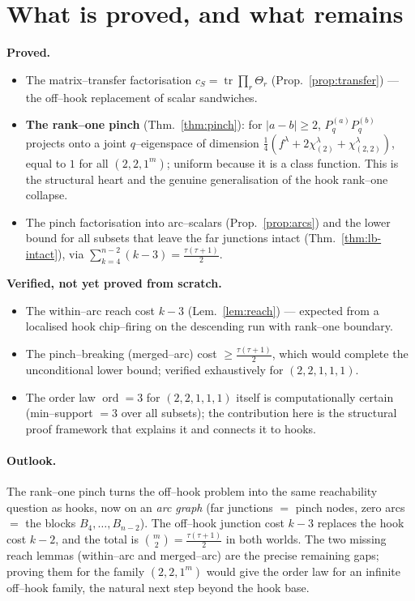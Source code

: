 \documentclass[11pt]{article}
\theoremstyle{definition}
\DeclareMathOperator{\tr}{tr}
\DeclareMathOperator{\ord}{ord}
\newcommand{\Pq}{P_{q}}
\newcommand{\la}{\lambda}
\begin{document}
\section{What is proved, and what remains}

\textbf{Proved.}
\begin{itemize}
\item The matrix--transfer factorisation $c_S=\tr\prod_r\Theta_r$
(Prop.~\ref{prop:transfer}) --- the off--hook replacement of scalar sandwiches.
\item \textbf{The rank--one pinch} (Thm.~\ref{thm:pinch}): for $|a-b|\ge2$,
$\Pq^{(a)}\Pq^{(b)}$ projects onto a joint $q$--eigenspace of dimension
$\tfrac14(f^\la+2\chi^\la_{(2)}+\chi^\la_{(2,2)})$, equal to $1$ for all $(2,2,1^m)$;
uniform because it is a class function. This is the structural heart and the genuine
generalisation of the hook rank--one collapse.
\item The pinch factorisation into arc--scalars (Prop.~\ref{prop:arcs}) and the lower
bound for all subsets that leave the far junctions intact
(Thm.~\ref{thm:lb-intact}), via $\sum_{k=4}^{n-2}(k-3)=\tfrac{\tau(\tau+1)}2$.
\end{itemize}

\textbf{Verified, not yet proved from scratch.}
\begin{itemize}
\item The within--arc reach cost $k-3$ (Lem.~\ref{lem:reach}) --- expected from a localised
hook chip--firing on the descending run with rank--one boundary.
\item The pinch--breaking (merged--arc) cost $\ge\tfrac{\tau(\tau+1)}2$, which would
complete the unconditional lower bound; verified exhaustively for $(2,2,1,1,1)$.
\item The order law $\ord=3$ for $(2,2,1,1,1)$ itself is computationally certain
(min--support $=3$ over all subsets); the contribution here is the structural proof
framework that explains it and connects it to hooks.
\end{itemize}

\paragraph{Outlook.} The rank--one pinch turns the off--hook problem into the same
reachability question as hooks, now on an \emph{arc graph} (far junctions $=$ pinch nodes,
zero arcs $=$ the blocks $B_4,\dots,B_{n-2}$). The off--hook junction cost $k-3$ replaces
the hook cost $k-2$, and the total is $\binom m2=\tfrac{\tau(\tau+1)}2$ in both worlds. The
two missing reach lemmas (within--arc and merged--arc) are the precise remaining gaps;
proving them for the family $(2,2,1^m)$ would give the order law for an infinite off--hook
family, the natural next step beyond the hook base.
\end{document}
